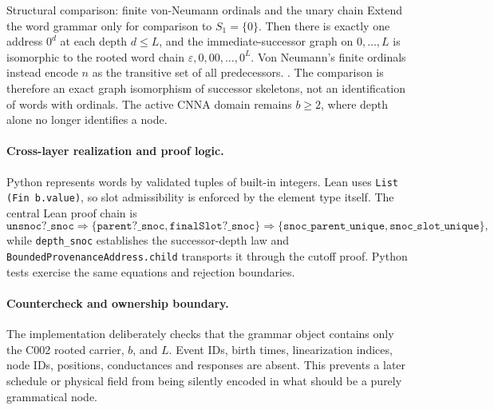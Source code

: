 \begin{cnnaInfoBox}{Structural comparison: finite von-Neumann ordinals and the unary chain}
Extend the word grammar only for comparison to $S_1=\{0\}$.  Then there is
exactly one address $0^d$ at each depth $d\le L$, and the immediate-successor
graph on $0,\ldots,L$ is isomorphic to the rooted word chain
$\varepsilon,0,00,\ldots,0^L$.  Von Neumann's finite ordinals instead encode
$n$ as the transitive set of all predecessors.
\cite[Introduction and displayed finite ordinals, pp.~199--200]{vonNeumann1923TransfiniteNumbers}.
The comparison is therefore an exact graph isomorphism of successor skeletons,
not an identification of words with ordinals.  The active CNNA domain remains
$b\ge2$, where depth alone no longer identifies a node.
\end{cnnaInfoBox}

\paragraph*{Cross-layer realization and proof logic.}
Python represents words by validated tuples of built-in integers.  Lean uses
\texttt{List (Fin b.value)}, so slot admissibility is enforced by the element
type itself.  The central Lean proof chain is
\begin{equation}
  \texttt{unsnoc?\_snoc}
  \Longrightarrow
  \{\texttt{parent?\_snoc},\texttt{finalSlot?\_snoc}\}
  \Longrightarrow
  \{\texttt{snoc\_parent\_unique},\texttt{snoc\_slot\_unique}\},
  \label{eq:c003-proof-chain}
\end{equation}
while \texttt{depth\_snoc} establishes the successor-depth law and
\texttt{BoundedProvenanceAddress.child} transports it through the cutoff
proof.  Python tests exercise the same equations and rejection boundaries.

\paragraph*{Countercheck and ownership boundary.}
The implementation deliberately checks that the grammar object contains only
the C002 rooted carrier, $b$, and $L$.  Event IDs, birth times, linearization
indices, node IDs, positions, conductances and responses are absent.  This
prevents a later schedule or physical field from being silently encoded in
what should be a purely grammatical node.

